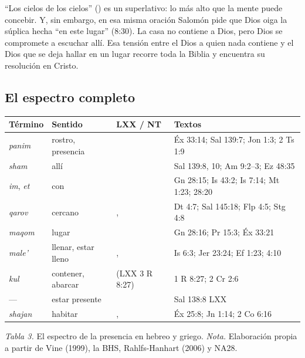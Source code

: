 ``Los cielos de los cielos'' () es un superlativo: lo más alto que la mente puede concebir. Y, sin embargo, en esa misma oración Salomón pide que Dios oiga la súplica hecha ``en este lugar'' (8:30). La casa no contiene a Dios, pero Dios se compromete a escuchar allí. Esa tensión entre el Dios a quien nada contiene y el Dios que se deja hallar en un lugar recorre toda la Biblia y encuentra su resolución en Cristo.

\subsection{El espectro completo}

\begin{center}\small\renewcommand{\arraystretch}{1.18}
\begin{tabular}{@{}L{3.1cm}L{3.4cm}L{3.6cm}L{3.9cm}@{}}
\toprule
\textbf{Término} & \textbf{Sentido} & \textbf{LXX / NT} & \textbf{Textos} \\ \midrule
{} \emph{panim} & rostro, presencia &  & Éx 33:14; Sal 139:7; Jon 1:3; 2 Ts 1:9 \\
 \emph{sham} & allí &  & Sal 139:8, 10; Am 9:2--3; Ez 48:35 \\
 \emph{im},  \emph{et} & con &  & Gn 28:15; Is 43:2; Is 7:14; Mt 1:23; 28:20 \\
 \emph{qarov} & cercano & ,  & Dt 4:7; Sal 145:18; Flp 4:5; Stg 4:8 \\
 \emph{maqom} & lugar &  & Gn 28:16; Pr 15:3; Éx 33:21 \\
 \emph{male'} & llenar, estar lleno & ,  & Is 6:3; Jer 23:24; Ef 1:23; 4:10 \\
 \emph{kul} & contener, abarcar &  (LXX 3 R 8:27) & 1 R 8:27; 2 Cr 2:6 \\
--- & estar presente &  & Sal 138:8 LXX \\
 \emph{shajan} & habitar & ,  & Éx 25:8; Jn 1:14; 2 Co 6:16 \\
\bottomrule
\end{tabular}\par
{\footnotesize\color{gris}\textit{Tabla 3.} El espectro de la presencia en hebreo y griego. \textit{Nota.} Elaboración propia a partir de Vine (1999), la BHS, Rahlfs-Hanhart (2006) y NA28.}
\end{center}

